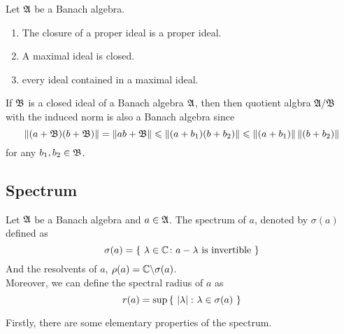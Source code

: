 \begin{cor}
	Let $\mathfrak{A}$ be a Banach algebra.
	\begin{enumerate}[label=\arabic*)]
		\item The closure of a proper ideal is a proper ideal.
		\item A maximal ideal is closed.
		\item every ideal contained in a maximal ideal.
	\end{enumerate}
\end{cor}

If $\mathfrak{B}$ is a closed ideal of a Banach algebra $\mathfrak{A}$, then then quotient algbra $\mathfrak{A}/\mathfrak{B}$ with the induced norm is also a Banach algebra since 
\begin{equation*}
	\left\lVert(a+\mathfrak{B})(b+\mathfrak{B})\right\lVert = \left\lVert ab+\mathfrak{B}\right\lVert \leqslant \left\lVert(a+b_1)(b+b_2)\right\lVert \leqslant \left\lVert(a+b_1)\right\lVert\left\lVert(b+b_2)\right\lVert
\end{equation*}
for any $b_1, b_2 \in \mathfrak{B}$.

\subsection{Spectrum}

\begin{defn}
	Let $\mathfrak{A}$ be a Banach algebra and $a \in \mathfrak{A}$. The spectrum of $a$, denoted by $\sigma(a)$ defined as
	\begin{equation*}
		\sigma(a) = \{~ \lambda \in \mathbb{C} \colon a-\lambda \text{ is invertible}~\}
	\end{equation*}	
	And the resolvents of $a$, $\rho(a) = \mathbb{C} \backslash \sigma(a)$.\\
	Moreover, we can define the spectral radius of $a$ as
	\begin{equation*}
		r(a) = \sup{\{~\left\lvert\lambda\right\lvert \colon \lambda \in \sigma(a)~\}}
	\end{equation*}
\end{defn}

Firstly, there are some elementary properties of the spectrum.

